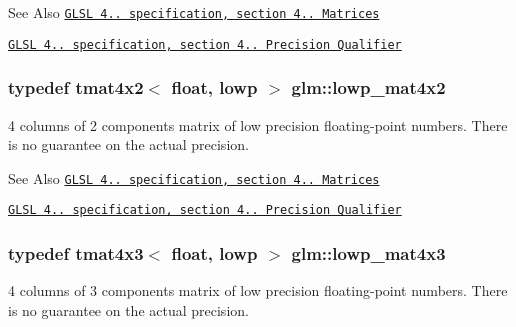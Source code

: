 \begin{DoxySeeAlso}{See Also}
\href{http://www.opengl.org/registry/doc/GLSLangSpec.4.20.8.pdf}{\tt G\-L\-S\-L 4.. specification, section 4.. Matrices} 

\href{http://www.opengl.org/registry/doc/GLSLangSpec.4.20.8.pdf}{\tt G\-L\-S\-L 4.. specification, section 4.. Precision Qualifier} 
\end{DoxySeeAlso}
\hypertarget{group__core__precision_gaae545974fa5b7fcb9574ea67f8922c50}{
\subsubsection[{lowp\-\_\-mat4x2}]{\setlength{\rightskip}{0pt plus 5cm}typedef tmat4x2$<$ float, lowp $>$ {\bf glm\-::lowp\-\_\-mat4x2}}}\label{group__core__precision_gaae545974fa5b7fcb9574ea67f8922c50}
4 columns of 2 components matrix of low precision floating-\/point numbers. There is no guarantee on the actual precision.

\begin{DoxySeeAlso}{See Also}
\href{http://www.opengl.org/registry/doc/GLSLangSpec.4.20.8.pdf}{\tt G\-L\-S\-L 4.. specification, section 4.. Matrices} 

\href{http://www.opengl.org/registry/doc/GLSLangSpec.4.20.8.pdf}{\tt G\-L\-S\-L 4.. specification, section 4.. Precision Qualifier} 
\end{DoxySeeAlso}
\hypertarget{group__core__precision_ga4649624907ac00347237476ead4178e1}{
\subsubsection[{lowp\-\_\-mat4x3}]{\setlength{\rightskip}{0pt plus 5cm}typedef tmat4x3$<$ float, lowp $>$ {\bf glm\-::lowp\-\_\-mat4x3}}}\label{group__core__precision_ga4649624907ac00347237476ead4178e1}
4 columns of 3 components matrix of low precision floating-\/point numbers. There is no guarantee on the actual precision.

